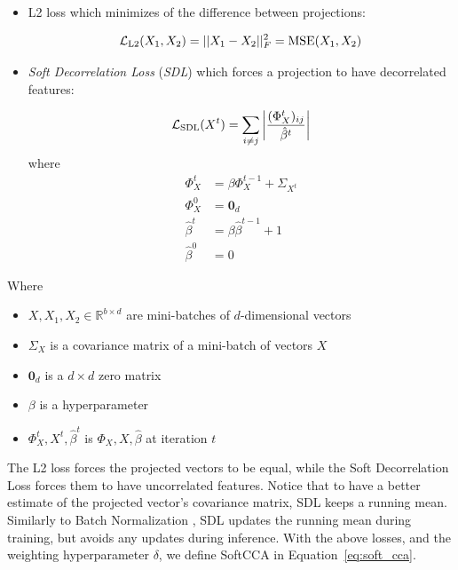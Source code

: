 \begin{itemize}

  \item L2 loss which minimizes of the difference between projections:

    \begin{equation}
      \mathcal{L}_{\text{L2}}(X_1, X_2) = ||X_1 - X_2||^2_F = \operatorname*{MSE}(X_1, X_2)
    \end{equation}

  \item \emph{Soft Decorrelation Loss} (\emph{SDL}) which forces a projection
    to have decorrelated features:

    \begin{equation}
      \mathcal{L}_{\text{SDL}}(X^t) = \sum_{i \ne j} \left|
          \frac{(\Phi^t_X)_{ij}}{\hat{\beta}^t}
          \right|
    \end{equation}
    where
    \begin{align}
      \Phi^t_X &= \beta \Phi^{t-1}_X + \Sigma_{X^t} \\
      \Phi^0_X &= \bm{0}_d \\
      \hat{\beta}^t &= \beta \hat{\beta}^{t-1} + 1 \\
      \hat{\beta}^0 &= 0
    \end{align}

\end{itemize}

Where

\begin{itemize}

  \item $X, X_1, X_2 \in \mathbb{R}^{b \times d}$ are mini-batches of
    $d$-dimensional vectors

  \item $\Sigma_{X}$ is a covariance matrix of a mini-batch of vectors $X$

  \item $\bm{0}_d$ is a $d \times d$ zero matrix

  \item $\beta$ is a hyperparameter

  \item $\Phi_X^t, X^t, \hat{\beta}^t$ is $\Phi_X, X, \hat{\beta}$ at iteration
    $t$

\end{itemize}

The L2 loss forces the projected vectors to be equal, while the Soft
Decorrelation Loss forces them to have uncorrelated features. Notice that to
have a better estimate of the projected vector's covariance matrix, SDL keeps a
running mean. Similarly to Batch Normalization \citep{ioffe2015batch}, SDL
updates the running mean during training, but avoids any updates during
inference. With the above losses, and the weighting hyperparameter
$\delta$, we define SoftCCA in Equation~\ref{eq:soft_cca}.

